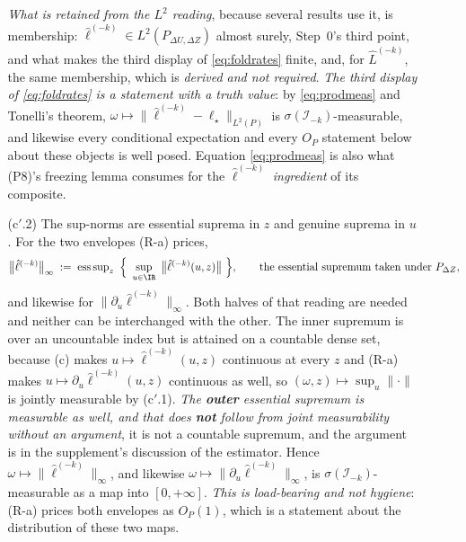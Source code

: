 \begin{definition}
\begin{enumerate}
\begin{enumerate}
\emph{What is retained from the $L^{2}$ reading}, because several results use it, is membership:
$\hat\ell^{(-k)}\in L^{2}(P_{\Delta U,\Delta Z})$ almost surely,  Step~0's third
point, and what makes the third display of \eqref{eq:foldrates} finite, and, for $\hat L^{(-k)}$, the
same membership, which is \emph{derived and not required}. \emph{The third display of \eqref{eq:foldrates} is a
statement with a truth value}: by \eqref{eq:prodmeas} and Tonelli's theorem,
$\omega\mapsto\|\hat\ell^{(-k)}-\ell_\star\|_{L^{2}(P)}$ is $\sigma(\mathcal I_{-k})$-measurable, and
likewise every conditional expectation and every $O_P$ statement below about these objects is well posed.
Equation \eqref{eq:prodmeas} is also what \textup{(P8)}'s freezing lemma consumes for the
$\hat\ell^{(-k)}$ \emph{ingredient} of its composite.
\item[(c$'$.2)] The sup-norms are essential suprema in $z$ and genuine suprema in $u$. For the two
envelopes (R-a) prices,
\begin{equation}\label{eq:supnormconv}
\big\|\hat\ell^{(-k)}\big\|_\infty
\;:=\;\operatorname{ess\,sup}_{z}\ \Big\{\ \sup_{u\in\IR}\ \big\|\hat\ell^{(-k)}(u,z)\big\|\ \Big\} ,
\qquad\text{the essential supremum taken under }P_{\Delta Z},
\end{equation}
and likewise for $\|\partial_u\hat\ell^{(-k)}\|_\infty$. Both halves of that reading are needed and
neither can be interchanged with the other. The inner supremum is over an uncountable index but is
attained on a countable dense set, because \textup{(c)} makes $u\mapsto\hat\ell^{(-k)}(u,z)$ continuous at
every $z$ and (R-a) makes $u\mapsto\partial_u\hat\ell^{(-k)}(u,z)$ continuous as well, so
$(\omega,z)\mapsto\sup_u\|\cdot\|$ is jointly measurable by \textup{(c$'$.1)}. \emph{The \textbf{outer}
essential supremum is measurable as well, and that does \textbf{not} follow from joint measurability without
an argument}, it is not a countable supremum, and the argument is in the supplement's discussion of the
estimator.
Hence $\omega\mapsto\|\hat\ell^{(-k)}\|_\infty$, and likewise
$\omega\mapsto\|\partial_u\hat\ell^{(-k)}\|_\infty$, is $\sigma(\mathcal I_{-k})$-measurable as a map into
$[0,+\infty]$. \emph{This is load-bearing and not hygiene}: (R-a) prices both envelopes as $O_P(1)$, which
is a statement about the distribution of these two maps.


\end{enumerate}
\end{enumerate}
\end{definition}
